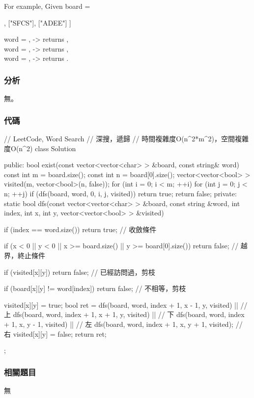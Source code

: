 For example,
Given board =
\begin{Code}
[
  ["ABCE"],
  ["SFCS"],
  ["ADEE"]
]
\end{Code}
word = , -> returns ,\\
word = , -> returns ,\\
word = , -> returns .


\subsubsection{分析}
無。


\subsubsection{代碼}
\begin{Code}
// LeetCode, Word Search
// 深搜，遞歸
// 時間複雜度O(n^2*m^2)，空間複雜度O(n^2)
class Solution {
public:
    bool exist(const vector<vector<char> > &board, const string& word) {
        const int m = board.size();
        const int n = board[0].size();
        vector<vector<bool> > visited(m, vector<bool>(n, false));
        for (int i = 0; i < m; ++i)
            for (int j = 0; j < n; ++j)
                if (dfs(board, word, 0, i, j, visited))
                    return true;
        return false;
    }
private:
    static bool dfs(const vector<vector<char> > &board, const string &word,
            int index, int x, int y, vector<vector<bool> > &visited) {
        if (index == word.size())
            return true; // 收斂條件

        if (x < 0 || y < 0 || x >= board.size() || y >= board[0].size())
            return false;  // 越界，終止條件

        if (visited[x][y]) return false; // 已經訪問過，剪枝

        if (board[x][y] != word[index]) return false; // 不相等，剪枝

        visited[x][y] = true;
        bool ret = dfs(board, word, index + 1, x - 1, y, visited) || // 上
                dfs(board, word, index + 1, x + 1, y, visited)    || // 下
                dfs(board, word, index + 1, x, y - 1, visited)    || // 左
                dfs(board, word, index + 1, x, y + 1, visited);      // 右
        visited[x][y] = false;
        return ret;
    }
};
\end{Code}


\subsubsection{相關題目}
\begindot
\item 無
\myenddot

